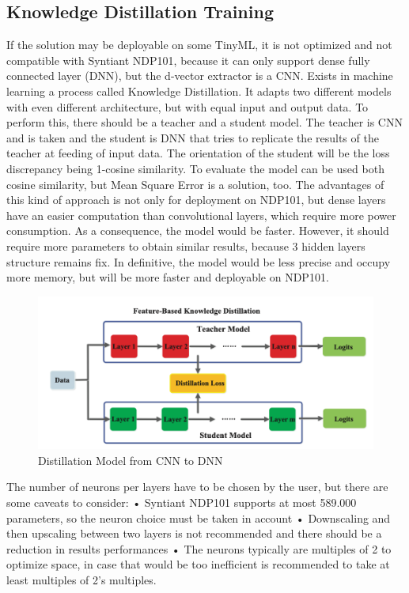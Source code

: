 \subsection{Knowledge Distillation Training}
If the solution may be deployable on some TinyML, it is not optimized and not compatible with Syntiant NDP101, because it can only support dense fully connected layer (DNN), but the d-vector extractor is a CNN\cite{distillation_from_cnn_to_dnn}\cite{knowledge_distillation}. Exists in machine learning a process called Knowledge Distillation. It adapts two different models with even different architecture, but with equal input and output data. To perform this, there should be a teacher and a student model. The teacher is CNN and is taken and the student is DNN that tries to replicate the results of the teacher at feeding of input data. The orientation of the student will be the loss discrepancy being 1-cosine similarity. To evaluate the model can be used both cosine similarity, but Mean Square Error is a solution, too. The advantages of this kind of approach is not only for deployment on NDP101, but dense layers have an easier computation than convolutional layers, which require more power consumption. As a consequence, the model would be faster. However, it should require more parameters to obtain similar results, because 3 hidden layers structure remains fix. In definitive, the model would be less precise and occupy more memory, but will be more faster and deployable on NDP101.
\begin{center}
\begin{figure}[!h]
        \centering
        \includegraphics[width=1.0\textwidth]{images/3.03 Distillation Technique.png}
        \caption{Distillation Model from CNN to DNN}
    \end{figure}
\end{center}
The number of neurons per layers have to be chosen by the user, but there are some caveats to consider:\newline
• Syntiant NDP101 supports at most 589.000 parameters, so the neuron choice must be taken in account\newline
• Downscaling and then upscaling between two layers is not recommended and there should be a reduction in results performances\newline
• The neurons typically are multiples of 2 to optimize space, in case that would be too inefficient is recommended to take at least multiples of 2's multiples.\newline
